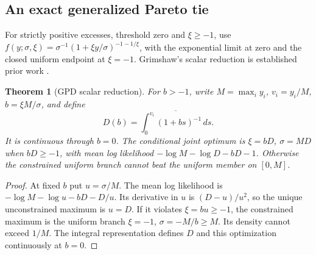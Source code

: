 \documentclass[12pt]{article}
\newtheorem{theorem}{Theorem}[section]
\theoremstyle{definition}
\theoremstyle{remark}
\begin{document}
\subsection{An exact generalized Pareto tie}
For strictly positive excesses, threshold zero and $\xi\ge-1$, use
$f(y;\sigma,\xi)=\sigma^{-1}(1+\xi y/\sigma)^{-1-1/\xi}$, with the
exponential limit at zero and the closed uniform endpoint at $\xi=-1$.
Grimshaw's scalar reduction is established prior work \cite{grimshaw}.
\begin{theorem}[GPD scalar reduction]\label{thm:gpdprofile}
For $b>-1$, write $M=\max_i y_i$, $v_i=y_i/M$, $b=\xi M/\sigma$, and define
\[
 D(b)=\overline{\int_0^{v_i}(1+bs)^{-1}\,ds}.
\]
It is continuous through $b=0$. The conditional joint optimum is
$\xi=bD$, $\sigma=MD$ when $bD\ge-1$, with mean log likelihood
$-\log M-\log D-bD-1$. Otherwise the constrained uniform branch cannot
beat the uniform member on $[0,M]$.
\end{theorem}
\begin{proof}
At fixed $b$ put $u=\sigma/M$. The mean log likelihood is
$-\log M-\log u-bD-D/u$. Its derivative in $u$ is $(D-u)/u^2$,
so the unique unconstrained maximum is $u=D$. If it violates
$\xi=bu\ge-1$, the constrained maximum is the uniform branch
$\xi=-1$, $\sigma=-M/b\ge M$. Its density cannot exceed $1/M$.
The integral representation defines $D$ and this optimization continuously
at $b=0$.
\end{proof}
\end{document}
